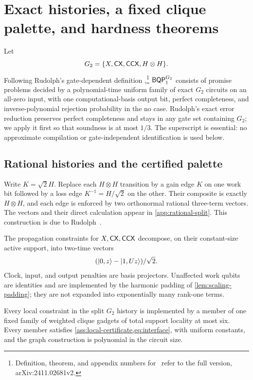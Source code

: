 \section{Exact histories, a fixed clique palette, and hardness theorems}
\label{sec:circuit}

Let
\[
G_2=\{X,\mathsf{CX},\mathsf{CCX},H\otimes H\}.
\]
Following Rudolph's gate-dependent definition
\cite[Definition~2.2]{rudolph2026universal},\footnote{Definition, theorem,
and appendix numbers for~\cite{rudolph2026universal} refer to the full
version, arXiv:2411.02681v2.} \(\mathsf{BQP}_{1}^{G_2}\) consists of
promise problems decided by a polynomial-time uniform family of exact
\(G_2\) circuits on an all-zero input, with one computational-basis output
bit, perfect completeness, and inverse-polynomial rejection probability in
the no case.  Rudolph's exact error reduction
\cite[Theorem~2.3]{rudolph2026universal} preserves perfect completeness and
stays in any gate set containing \(G_2\); we apply it first so that soundness
is at most \(1/3\).  The superscript is essential: no approximate compilation
or gate-independent identification is used below.

\subsection{Rational histories and the certified palette}

Write \(K=\sqrt2H\).  Replace each \(H\otimes H\) transition by a gain edge
\(K\) on one work bit followed by a loss edge \(K^{-1}=H/\sqrt2\) on the
other.  Their composite is exactly \(H\otimes H\), and each edge is enforced
by two orthonormal rational three-term vectors.  The vectors and their direct
calculation appear in \cref{app:rational-split}.  This construction is due to
Rudolph~\cite[Appendix~D.1]{rudolph2026universal}.

The propagation constraints for \(X,\mathsf{CX},\mathsf{CCX}\) decompose, on their
constant-size active support, into two-time vectors
\[
(\lvert 0,z\rangle-\lvert 1,Uz\rangle)/\sqrt2.
\]
Clock, input, and output penalties are basis projectors.  Unaffected work
qubits are identities and are implemented by the harmonic padding of
\cref{lem:scaling-padding}; they are not expanded into exponentially many
rank-one terms.

\begin{lemma}
\label{lem:palette}
Every local constraint in the split \(G_2\) history is implemented by a
member of one fixed family of weighted clique gadgets of total support
locality at most six.  Every member satisfies
\cref{ass:local-certificate,eq:interface}, with uniform constants, and the
graph construction is polynomial in the circuit size.
\end{lemma}

